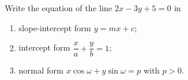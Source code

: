Write the equation of the line $2x-3y+5=0$ in
\begin{enumerate}
\item[(a)] slope-intercept form $y=mx+c$;
\item[(b)] intercept form $\dfrac xa+\dfrac yb=1$;
\item[(c)] normal form $x\cos\omega+y\sin\omega=p$ with $p>0$.
\end{enumerate}
